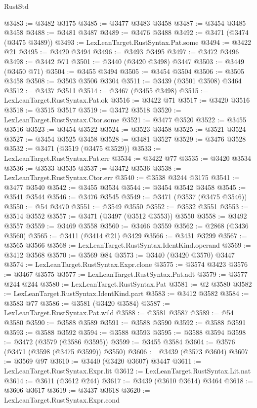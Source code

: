 \begin{lexlean}{RustStd}
\begin{coremodule}
{{{{{{{{{{{{{{{{{{{@3483 := @3482 @3175
@3485 := @3477 @3483 @3458
@3487 := @3454 @3485 @3458
@3488 := @3481 @3487
@3489 := @3476 @3488
@3492 := @3471 (@3474 (@3475 @3489))
@3493 := LexLeanTarget.RustSyntax.Pat.some
@3494 := @3422 @21
@3495 := @3420 @3494
@3496 := @3493 @3495
@3497 := @3472 @3496
@3498 := @3442 @71
@3501 := @3440 (@3420 @3498) @3447
@3503 := @3449 (@3450 @71)
@3504 := @3455 @3494
@3505 := @3454 @3504
@3506 := @3505 @3458
@3508 := @3503 @3506 @3304
@3511 := @3439 (@3501 @3508) @3464
@3512 := @3437 @3511
@3514 := @3467 (@3455 @3498)
@3515 := LexLeanTarget.RustSyntax.Pat.ok
@3516 := @3422 @71
@3517 := @3420 @3516
@3518 := @3515 @3517
@3519 := @3472 @3518
@3520 := LexLeanTarget.RustSyntax.Ctor.some
@3521 := @3477 @3520
@3522 := @3455 @3516
@3523 := @3454 @3522
@3524 := @3523 @3458
@3525 := @3521 @3524
@3527 := @3454 @3525 @3458
@3528 := @3481 @3527
@3529 := @3476 @3528
@3532 := @3471 (@3519 (@3475 @3529))
@3533 := LexLeanTarget.RustSyntax.Pat.err
@3534 := @3422 @77
@3535 := @3420 @3534
@3536 := @3533 @3535
@3537 := @3472 @3536
@3538 := LexLeanTarget.RustSyntax.Ctor.err
@3540 := @3538 @3244 @3175
@3541 := @3477 @3540
@3542 := @3455 @3534
@3544 := @3454 @3542 @3458
@3545 := @3541 @3544
@3546 := @3476 @3545
@3549 := @3471 (@3537 (@3475 @3546))
@3550 := @54 @3470
@3551 := @3549 @3550
@3552 := @3532 @3551
@3553 := @3514 @3552
@3557 := @3471 (@3497 (@3512 @3553)) @3550
@3558 := @3492 @3557
@3559 := @3469 @3558
@3560 := @3466 @3559
@3562 := @2868 (@3436 @3560)
@3565 := @3411 (@3414 @21) @3429
@3566 := @3431 @3299
@3567 := @3565 @3566
@3568 := LexLeanTarget.RustSyntax.IdentKind.operand
@3569 := @3412 @3568
@3570 := @3569 @84
@3573 := @3440 (@3420 @3570) @3447
@3574 := LexLeanTarget.RustSyntax.Expr.clone
@3575 := @3574 @3423
@3576 := @3467 @3575
@3577 := LexLeanTarget.RustSyntax.Pat.adt
@3579 := @3577 @244 @244
@3580 := LexLeanTarget.RustSyntax.Pat
@3581 := @2 @3580
@3582 := LexLeanTarget.RustSyntax.IdentKind.part
@3583 := @3412 @3582
@3584 := @3583 @77
@3586 := @3581 (@3420 @3584)
@3587 := LexLeanTarget.RustSyntax.Pat.wild
@3588 := @3581 @3587
@3589 := @54 @3580
@3590 := @3588 @3589
@3591 := @3588 @3590
@3592 := @3588 @3591
@3593 := @3588 @3592
@3594 := @3588 @3593
@3595 := @3588 @3594
@3598 := @3472 (@3579 (@3586 @3595))
@3599 := @3455 @3584
@3604 := @3576 (@3471 (@3598 (@3475 @3599)) @3550)
@3606 := @3439 (@3573 @3604)
@3607 := @3569 @97
@3610 := @3440 (@3420 @3607) @3447
@3611 := LexLeanTarget.RustSyntax.Expr.lit
@3612 := LexLeanTarget.RustSyntax.Lit.nat
@3614 := @3611 (@3612 @244)
@3617 := @3439 (@3610 @3614) @3464
@3618 := @3606 @3617
@3619 := @3437 @3618
@3620 := LexLeanTarget.RustSyntax.Expr.cond
}}}}}}}}}}}}}}}}}}}
\end{coremodule}
\end{lexlean}

